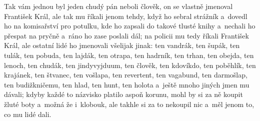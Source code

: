 Tak vám jednou byl jeden chudý pán neboli člověk, on se vlastně jmenoval
František Král, ale tak mu říkali jenom tehdy, když ho sebral strážník
a~dovedl ho na komisařství pro potulku, kde ho zapsali do takové tlusté knihy
a~nechali ho přespat na pryčně a~ráno ho zase poslali dál; na policii mu
tedy říkali František Král, ale ostatní lidé ho jmenovali všelijak jinak:
ten vandrák, ten šupák, ten tulák, ten pobuda, ten lajdák, ten otrapa, ten
hadrník, ten trhan, ten obejda, ten lenoch, ten chudák, ten jindyvyjduum,
ten člověk, ten kdovíkdo, ten poběhlík, ten krajánek, ten štvanec, ten
vošlapa, ten revertent, ten vagabund, ten darmošlap, ten budižkničemu, ten
hlad, ten hunt, ten holota a~ještě mnoho jiných jmen mu dávali; kdyby každé
to názvisko platilo aspoň korunu, mohl by si za ně koupit žluté boty a~možná
že i~klobouk, ale takhle si za to nekoupil nic a~měl jenom to, co mu lidé
dali. 
